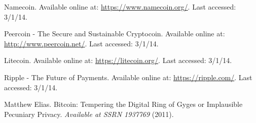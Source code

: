 \documentclass[conference]{IEEEtran}
\begin{document}
\begin{thebibliography}{1}
 Namecoin. Available online at: \url{https://www.namecoin.org/}. Last accessed: 3/1/14. 

 Peercoin - The Secure and Sustainable Cryptocoin. Available online at: \url{http://www.peercoin.net/}. Last accessed: 3/1/14. 

 Litecoin. Available online at: \url{https://litecoin.org/}. Last accessed: 3/1/14.

 Ripple - The Future of Payments. Available online at: \url{https://ripple.com/}. Last accessed: 3/1/14.

 Matthew Elias. Bitcoin: Tempering the Digital Ring of Gyges or Implausible Pecuniary Privacy. \emph{Available at SSRN 1937769} (2011).

\end{thebibliography}




\end{document}
